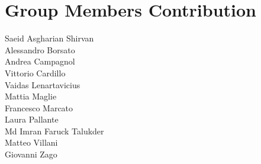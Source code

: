 \section{Group Members Contribution}


\begin{description}
	\item[Saeid Asgharian Shirvan] \lipsum[1]
	\item[Alessandro Borsato] \lipsum[1]
	\item[Andrea Campagnol]\lipsum[1]
	\item[Vittorio Cardillo] \lipsum[1]
	\item[Vaidas Lenartavicius] \lipsum[1]
	\item[Mattia Maglie] \lipsum[1]
	\item[Francesco Marcato] \lipsum[1]
	\item[Laura Pallante] \lipsum[1]
	\item[Md Imran Faruck Talukder] \lipsum[1]
	\item[Matteo Villani] \lipsum[1]
	\item[Giovanni Zago]\lipsum[1]
\end{description}